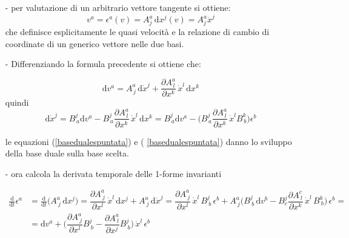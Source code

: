 \begin{itemize}
\item[-] per valutazione di un arbitrario vettore tangente si ottiene:
\begin{displaymath}
v^{a} = \epsilon^{a} ( v ) = A^{a}_{j} \, \textrm{d}x^{j} (v) = A^{a}_{j} \dot{x}^{j}
\end{displaymath}
che definisce esplicitamente le quasi velocità e la relazione di cambio di coordinate di un generico vettore nelle due basi.

\item[-] Differenziando la formula precedente si ottiene che:

\begin{displaymath}
\textrm{d} v^{a} = A^{a}_{\,j} \, \textrm{d} \dot{x}^{j} + \dfrac{\partial A^{a}_{\,l}}{\partial x^{k}}\, \dot{x}^{l} \, \textrm{d} x^{k}
\end{displaymath}
quindi
\begin{equation}\label{basedualepuntata}
\textrm{d}\dot{x}^{j} = B^{j}_{\,a} \textrm{d} v^{a} - B^{j}_{\,a}\dfrac{\partial A^{a}_{\,l}}{\partial x^{k}}\, \dot{x}^{l} \, \textrm{d} x^{k} = B^{j}_{\,a} \textrm{d} v^{a} - \Bigr(B^{j}_{\,a}  \dfrac{\partial A^{a}_{\,l}}{\partial x^{k}}\, \dot{x}^{l} B^{k}_{\, b} \Bigr) \epsilon^{b}
\end{equation}

le equazioni (\ref{basedualespuntata}) e ( \ref{basedualespuntata}) danno lo sviluppo della base duale sulla base scelta.

\item[-] ora calcola la derivata temporale delle 1-forme invarianti

\begin{displaymath}\begin{split}
\frac{\textrm{d}}{\textrm{d}t} \epsilon^{a} & = \frac{\textrm{d}}{\textrm{d}t}\Bigr( A^{a}_{\: j}\, \textrm{d}x^{j} \Bigr) = \dfrac{\partial A^{a}_{\: j}}{\partial x^{l}}\, \dot{x}^{l}\, \textrm{d}x^{j} + A^{a}_{\: j}\, \textrm{d}\dot{x}^{j} =
\dfrac{\partial A^{a}_{\: j}}{\partial x^{l}}\, \dot{x}^{l}\, B^{j}_{\: b}\, \epsilon^{b} + A^{a}_{\: j} \Bigr( B^{j}_{\: b} \, \textrm{d}v^{b} - B^{j}_{c} \dfrac{\partial A^{c}_{\: l}}{\partial x^{k}}\, \dot{x}^{l} \, B^{k}_{\: b}\Bigr)\, \epsilon^{b} = \\ & =
\textrm{d} v^{a} + \Bigr( \dfrac{\partial A^{a}_{\:j}}{\partial x^{l}}B^{j}_{\: b} -   \dfrac{\partial A^{a}_{\: l}}{\partial x^{j}}B^{j}_{\: b}\Bigr)\, \dot{x}^{l} \, \epsilon^{b}
\end{split}\end{displaymath}



\end{itemize}
